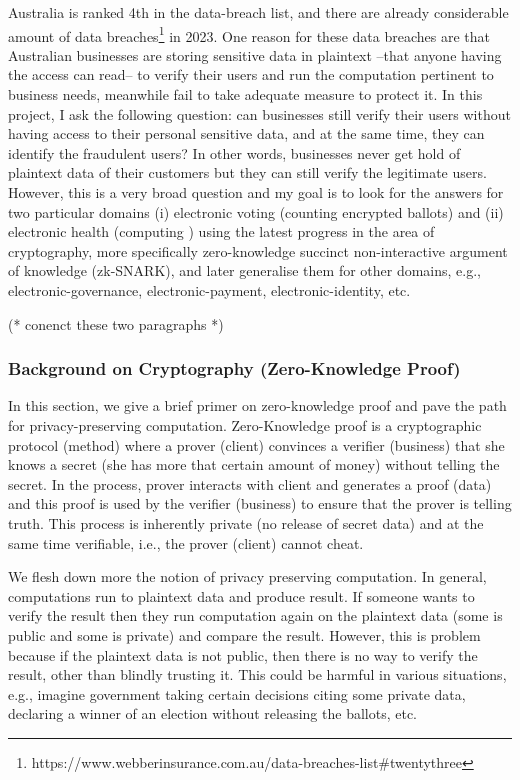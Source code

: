 \documentclass[12pt,a4paper]{article}
\begin{document}
Australia is ranked 4th in the data-breach list, and  
there are already considerable amount of 
data breaches\footnote{https://www.webberinsurance.com.au/data-breaches-list\#twentythree} in 2023.  
One reason for these data breaches are that Australian businesses are 
storing sensitive data in plaintext --that anyone having the access can read--  
to verify their users and run the computation pertinent to business needs,
meanwhile fail to take adequate measure to protect it. 
In this project, I ask the following question: can businesses still 
verify their users without having access to their personal sensitive 
data, and at the same time, they can identify the 
fraudulent users? In other words, businesses never get hold of 
plaintext data of their customers but they can still verify 
the legitimate users. However, this is a very broad question and 
my goal is to look for the answers for two 
particular domains (i) electronic voting (counting encrypted ballots) and 
(ii) electronic health (computing ) using the latest 
progress in the area of cryptography, more specifically 
zero-knowledge succinct non-interactive argument of knowledge (zk-SNARK), 
and later generalise them for other domains, e.g., 
electronic-governance, electronic-payment, electronic-identity, etc. 


(* conenct these two paragraphs *)



\subsubsection*{Background on Cryptography (Zero-Knowledge Proof)}

In this section, we give a brief primer on zero-knowledge proof and 
pave the path for privacy-preserving computation. Zero-Knowledge proof is 
a cryptographic protocol (method) where a prover (client) convinces a verifier (business)
that she knows a secret (she has more that certain amount of money) without 
telling the secret. In the process, prover interacts with client and 
generates a proof (data) and this proof is used by the verifier (business)
to ensure that the prover is telling truth. This process is inherently 
private (no release of secret data) and at the same time verifiable, i.e., 
the prover (client) cannot cheat. 

We flesh down more the notion of privacy preserving computation. 
In general, computations run to plaintext data and produce result. 
If someone wants to verify the result then they run computation 
again on the plaintext data (some is public and some is private) 
and compare the result. 
However, this is problem  because if the plaintext data 
is not public, then there is no way to verify the result, 
other than blindly trusting it. This could be harmful 
in various situations, e.g., imagine government 
taking certain decisions citing some private data, 
declaring a winner of an election without releasing the 
ballots, etc. 
\end{document}
